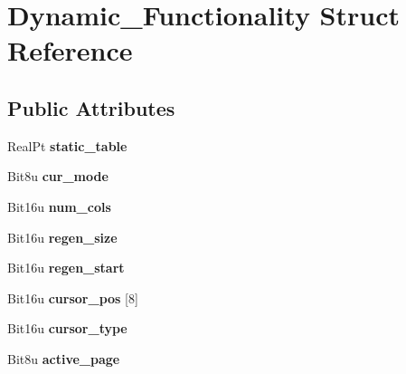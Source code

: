 \hypertarget{structDynamic__Functionality}{\section{Dynamic\-\_\-\-Functionality Struct Reference}
\label{structDynamic__Functionality}
}
\subsection*{Public Attributes}
\begin{DoxyCompactItemize}
\item 
\hypertarget{structDynamic__Functionality_a4c8ce693c881b561685527ee5db98f49}{Real\-Pt {\bfseries static\-\_\-table}}\label{structDynamic__Functionality_a4c8ce693c881b561685527ee5db98f49}

\item 
\hypertarget{structDynamic__Functionality_ac0e8c7c0393df365363dbeed38584e38}{Bit8u {\bfseries cur\-\_\-mode}}\label{structDynamic__Functionality_ac0e8c7c0393df365363dbeed38584e38}

\item 
\hypertarget{structDynamic__Functionality_a3d911cb6b9a6c09010bac5723bc7d63c}{Bit16u {\bfseries num\-\_\-cols}}\label{structDynamic__Functionality_a3d911cb6b9a6c09010bac5723bc7d63c}

\item 
\hypertarget{structDynamic__Functionality_ac8d55e4a96036267e2fde22016aee8c5}{Bit16u {\bfseries regen\-\_\-size}}\label{structDynamic__Functionality_ac8d55e4a96036267e2fde22016aee8c5}

\item 
\hypertarget{structDynamic__Functionality_a8c9f4e86d174660799d3b4fee86be58c}{Bit16u {\bfseries regen\-\_\-start}}\label{structDynamic__Functionality_a8c9f4e86d174660799d3b4fee86be58c}

\item 
\hypertarget{structDynamic__Functionality_a4159895be22dd38f3b62c12bb8f26965}{Bit16u {\bfseries cursor\-\_\-pos} \mbox{[}8\mbox{]}}\label{structDynamic__Functionality_a4159895be22dd38f3b62c12bb8f26965}

\item 
\hypertarget{structDynamic__Functionality_a808a0ba984d4dbbeec041d71fae9672a}{Bit16u {\bfseries cursor\-\_\-type}}\label{structDynamic__Functionality_a808a0ba984d4dbbeec041d71fae9672a}

\item 
\hypertarget{structDynamic__Functionality_a7b3d2f303bf72066cf732253774c2b5c}{Bit8u {\bfseries active\-\_\-page}}\label{structDynamic__Functionality_a7b3d2f303bf72066cf732253774c2b5c}


\end{DoxyCompactItemize}
